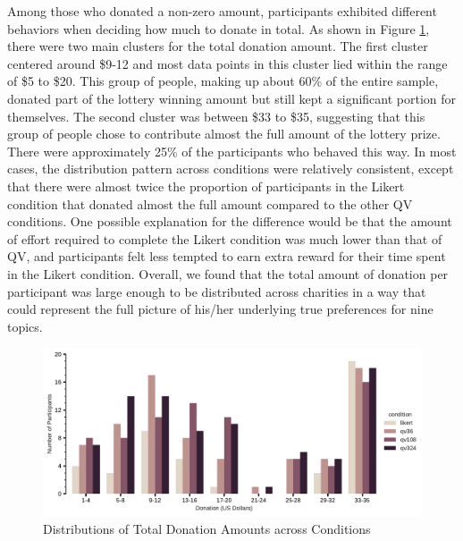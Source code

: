 Among those who donated a non-zero amount, participants exhibited different behaviors when deciding how much to donate in total. As shown in Figure \ref{fig:total_don_exp1}, there were two main clusters for the total donation amount. The first cluster centered around \$9-12 and most data points in this cluster lied within the range of \$5 to \$20. This group of people, making up about 60\% of the entire sample, donated part of the lottery winning amount but still kept a significant portion for themselves. The second cluster was between \$33 to \$35, suggesting that this group of people chose to contribute almost the full amount of the lottery prize. There were approximately 25\% of the participants who behaved this way. In most cases, the distribution pattern across conditions were relatively consistent, except that there were almost twice the proportion of participants in the Likert condition that donated almost the full amount compared to the other QV conditions. One possible explanation for the difference would be that the amount of effort required to complete the Likert condition was much lower than that of QV, and participants felt less tempted to earn extra reward for their time spent in the Likert condition. Overall, we found that the total amount of donation per participant was large enough to be distributed across charities in a way that could represent the full picture of his/her underlying true preferences for nine topics.

\begin{figure}[htpb]
    \centering
    \includegraphics[width=\textwidth, keepaspectratio=true]{content/image/total_contributions_across_conditions.pdf}
    \caption{
       Distributions of Total Donation Amounts across Conditions
    }
    \label{fig:total_don_exp1}
\end{figure}

